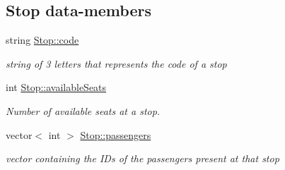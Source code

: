 \subsection*{Stop data-\/members}
\begin{DoxyCompactItemize}
\item 
\mbox{\label{group___stop_ga5a0dddd108225fd437be86eed7b3a3ef}} 
string \hyperlink{group___stop_ga5a0dddd108225fd437be86eed7b3a3ef}{Stop\+::code}
\begin{DoxyCompactList}\small\item\em string of 3 letters that represents the code of a stop \end{DoxyCompactList}\item 
\mbox{\label{group___stop_ga459aba5bcfa17889d2f292f3f45528bc}} 
int \hyperlink{group___stop_ga459aba5bcfa17889d2f292f3f45528bc}{Stop\+::available\+Seats}
\begin{DoxyCompactList}\small\item\em Number of available seats at a stop. \end{DoxyCompactList}\item 
\mbox{\label{group___stop_ga2886c8f28932f3884ba3e4f741e7ec91}} 
vector$<$ int $>$ \hyperlink{group___stop_ga2886c8f28932f3884ba3e4f741e7ec91}{Stop\+::passengers}
\begin{DoxyCompactList}\small\item\em vector containing the I\+Ds of the passengers present at that stop \end{DoxyCompactList}\end{DoxyCompactItemize}
